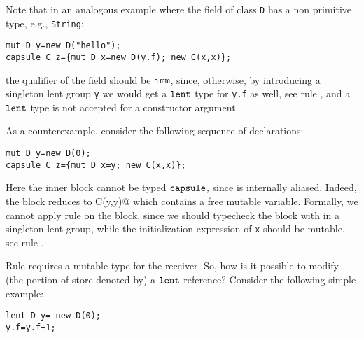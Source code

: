 {Note that in an analogous example where the field of class \lstinline{D} has a non primitive type, e.g., \lstinline{String}:}
\begin{lstlisting}
mut D y=new D("hello"); 
capsule C z={mut D x=new D(y.f); new C(x,x)};  
\end{lstlisting}
{the qualifier of the field should be $\texttt{imm}$, since, otherwise, by introducing a singleton {lent group} \lstinline{y} we would get a $\texttt{lent}$ type for \lstinline{y.f} as well, see rule , and a $\texttt{lent}$ type is not accepted for a constructor argument.}

As a counterexample, consider the following sequence of declarations:
\begin{lstlisting}
mut D y=new D(0); 
capsule C z={mut D x=y; new C(x,x)};  
\end{lstlisting}
Here the inner block cannot be typed $\texttt{capsule}$, since \Q@y@ is internally aliased. Indeed, the block reduces to \Q@new C(y,y)@ which contains a free mutable variable.
Formally, we cannot apply rule  on the block, since
we should typecheck the block with \Q@y@ in a singleton {lent group}, while the initialization expression of \lstinline{x} should be mutable, see rule .

Rule  requires a mutable type for the receiver.
So, how is it possible to modify (the portion of store denoted by) a $\texttt{lent}$ reference?
Consider the following simple example:
\begin{lstlisting}
lent D y= new D(0);
y.f=y.f+1;
\end{lstlisting}

